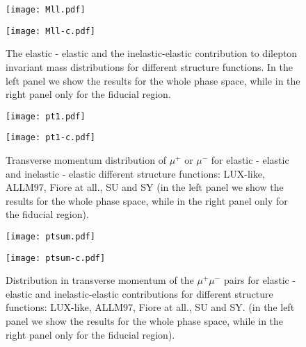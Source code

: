 \begin{figure}[!h]
\begin{minipage}{0.47\textwidth}
 \centerline{\texttt{[image: Mll.pdf]}}
\end{minipage}
\begin{minipage}{0.47\textwidth}
 \centerline{\texttt{[image: Mll-c.pdf]}}
\end{minipage}
\caption{The elastic - elastic and the inelastic-elastic contribution 
to dilepton invariant mass distributions 
for different structure functions. In the left panel we show the results for the whole phase space, while in the right panel only for the fiducial region.
}
 \label{fig:dsig_dMWW_ineine}
\end{figure}

\begin{figure}[!htbp]
\begin{minipage}{0.47\textwidth}
 \centerline{\texttt{[image: pt1.pdf]}}
\end{minipage}
\begin{minipage}{0.47\textwidth}
 \centerline{\texttt{[image: pt1-c.pdf]}}
\end{minipage}
\caption{
Transverse momentum distribution of $\mu^+$ or $\mu^-$ 
for elastic - elastic and inelastic - elastic different structure functions: LUX-like, ALLM97, Fiore at all., SU and SY (in the left panel we show the results for the whole phase space, while in the right panel only for the fiducial region).
}
 \label{fig:dsig_dMWW_ineine}
\end{figure}


\begin{figure}[!htbp]
\begin{minipage}{0.47\textwidth}
 \centerline{\texttt{[image: ptsum.pdf]}}
\end{minipage}
\begin{minipage}{0.47\textwidth}
 \centerline{\texttt{[image: ptsum-c.pdf]}}
\end{minipage}
\caption{
Distribution in transverse momentum of the $\mu^+ \mu^-$ pairs for elastic - elastic and 
inelastic-elastic
contributions
for different structure functions: LUX-like, ALLM97, Fiore at all., SU and SY. (in the left panel we show the results for the whole phase space, while in the right panel only for the fiducial region).
}
 \label{fig:dsig_dMWW_ineine}
\end{figure}


